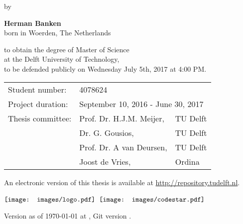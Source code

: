 \begin{minipage}[t][0.99\textheight]{0.99\textwidth}
    \begin{center}
        \vspace*{1cm}
        
        \Huge
        \textbf{\thesistitle}
        
        \large
		\vspace{0.5cm}
		by
        \vspace{0.5cm}
        
        \Large
        \textbf{Herman Banken}\\
		\normalsize
        born in Woerden, The Netherlands
        
        \vspace{1cm}
        \vfill

		to obtain the degree of Master of Science\\
		at the Delft University of Technology,\\
		to be defended publicly on Wednesday July 5th, 2017 at 4:00 PM.
        
        \vspace{0.8cm}
                
		\begin{tabular}{l l l}
		Student number:     & \multicolumn{2}{l}{4078624} \\
		Project duration:   & \multicolumn{2}{l}{September 10, 2016 - June 30, 2017} \\
		Thesis committee:   & Prof. Dr. H.J.M. Meijer, 	& TU Delft \\
    						& Dr. G. Gousios,           & TU Delft \\
    						& Prof. Dr. A van Deursen,  & TU Delft \\
    						& Joost de Vries,           & Ordina
		\end{tabular}

        \vspace{0.8cm}

		An electronic version of this thesis is available at \url{http://repository.tudelft.nl}.

\begin{minipage}{6in}
  \centering
  $\vcenter{\hbox{\texttt{[image: images/logo.pdf]}}}$
  \hspace*{.2in}
  $\vcenter{\hbox{\texttt{[image: images/codestar.pdf]}}}$
\end{minipage}

\small
Version as of {\today}
at \currenttime, Git version \gitrevision.
        
    \end{center}
\end{minipage}